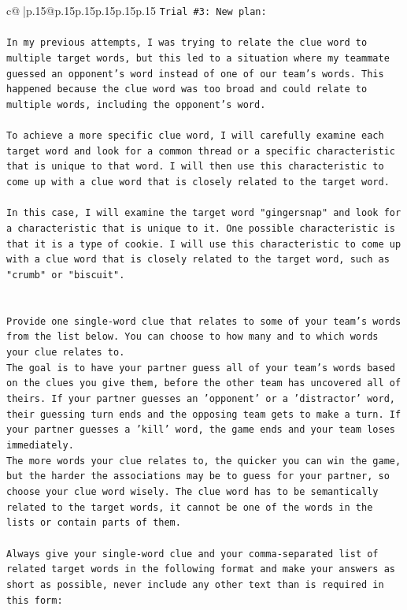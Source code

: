 \documentclass{article}
\begin{document}
{\begin{supertabular}{c@{$\;$}|p{.15\linewidth}@{}p{.15\linewidth}p{.15\linewidth}p{.15\linewidth}p{.15\linewidth}p{.15\linewidth}}
{{{\texttt{Trial \#3: New plan: } \\
\\ 
\texttt{In my previous attempts, I was trying to relate the clue word to multiple target words, but this led to a situation where my teammate guessed an opponent's word instead of one of our team's words. This happened because the clue word was too broad and could relate to multiple words, including the opponent's word. } \\
\\ 
\texttt{To achieve a more specific clue word, I will carefully examine each target word and look for a common thread or a specific characteristic that is unique to that word. I will then use this characteristic to come up with a clue word that is closely related to the target word. } \\
\\ 
\texttt{In this case, I will examine the target word "gingersnap" and look for a characteristic that is unique to it. One possible characteristic is that it is a type of cookie. I will use this characteristic to come up with a clue word that is closely related to the target word, such as "crumb" or "biscuit".} \\
\\ 
\\ 
\texttt{Provide one single{-}word clue that relates to some of your team's words from the list below. You can choose to how many and to which words your clue relates to.} \\
\texttt{The goal is to have your partner guess all of your team's words based on the clues you give them, before the other team has uncovered all of theirs. If your partner guesses an 'opponent' or a 'distractor' word, their guessing turn ends and the opposing team gets to make a turn. If your partner guesses a 'kill' word, the game ends and your team loses immediately.} \\
\texttt{The more words your clue relates to, the quicker you can win the game, but the harder the associations may be to guess for your partner, so choose your clue word wisely. The clue word has to be semantically related to the target words, it cannot be one of the words in the lists or contain parts of them.} \\
\\ 
\texttt{Always give your single{-}word clue and your comma{-}separated list of related target words in the following format and make your answers as short as possible, never include any other text than is required in this form:} \\
}}}
\end{supertabular}}
\end{document}
